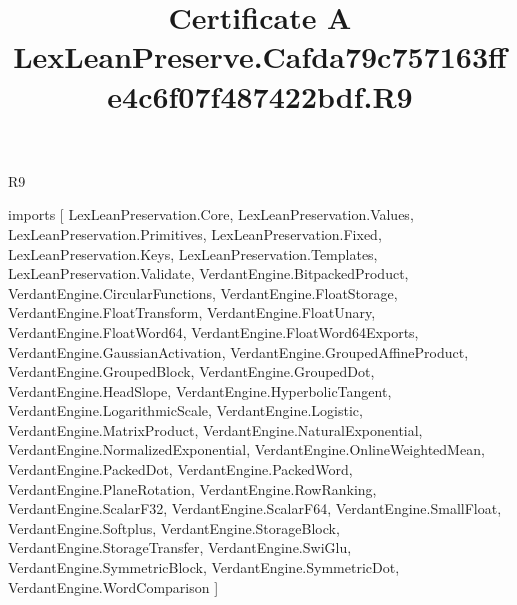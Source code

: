 \begin{lexlean}{R9}
\title{Certificate A LexLeanPreserve.Cafda79c757163ffe4c6f07f487422bdf.R9}
\begin{coremodule}
imports [
  LexLeanPreservation.Core,
  LexLeanPreservation.Values,
  LexLeanPreservation.Primitives,
  LexLeanPreservation.Fixed,
  LexLeanPreservation.Keys,
  LexLeanPreservation.Templates,
  LexLeanPreservation.Validate,
  VerdantEngine.BitpackedProduct,
  VerdantEngine.CircularFunctions,
  VerdantEngine.FloatStorage,
  VerdantEngine.FloatTransform,
  VerdantEngine.FloatUnary,
  VerdantEngine.FloatWord64,
  VerdantEngine.FloatWord64Exports,
  VerdantEngine.GaussianActivation,
  VerdantEngine.GroupedAffineProduct,
  VerdantEngine.GroupedBlock,
  VerdantEngine.GroupedDot,
  VerdantEngine.HeadSlope,
  VerdantEngine.HyperbolicTangent,
  VerdantEngine.LogarithmicScale,
  VerdantEngine.Logistic,
  VerdantEngine.MatrixProduct,
  VerdantEngine.NaturalExponential,
  VerdantEngine.NormalizedExponential,
  VerdantEngine.OnlineWeightedMean,
  VerdantEngine.PackedDot,
  VerdantEngine.PackedWord,
  VerdantEngine.PlaneRotation,
  VerdantEngine.RowRanking,
  VerdantEngine.ScalarF32,
  VerdantEngine.ScalarF64,
  VerdantEngine.SmallFloat,
  VerdantEngine.Softplus,
  VerdantEngine.StorageBlock,
  VerdantEngine.StorageTransfer,
  VerdantEngine.SwiGlu,
  VerdantEngine.SymmetricBlock,
  VerdantEngine.SymmetricDot,
  VerdantEngine.WordComparison
]


\end{coremodule}
\end{lexlean}

